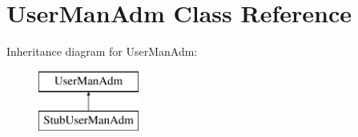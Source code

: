 \hypertarget{classUserManAdm}{\section{User\-Man\-Adm Class Reference}
\label{da/d86/classUserManAdm}
}
Inheritance diagram for User\-Man\-Adm\-:\begin{figure}[H]
\begin{center}
\leavevmode
\includegraphics[height=2.000000cm]{da/d86/classUserManAdm}
\end{center}
\end{figure}
